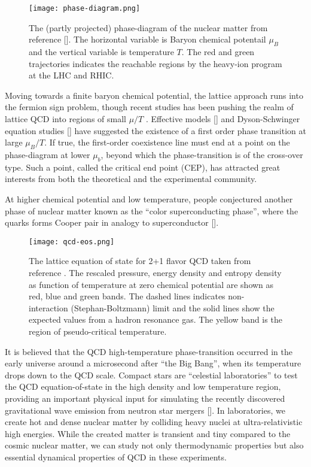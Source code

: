 \begin{figure}
    \centering
    \texttt{[image: phase-diagram.png]}
    \caption{The (partly projected) phase-diagram of the nuclear matter from reference []. The horizontal variable is Baryon chemical potentail $\mu_B$ and the vertical variable is temperature $T$. The red and green trajectories indicates the reachable regions by the heavy-ion program at the LHC and RHIC.}
    \label{fig:phase-diagram}
\end{figure}

Moving towards a finite baryon chemical potential, the lattice approach runs into the fermion sign problem, though recent studies has been pushing the realm of lattice QCD into regions of small $\mu/T$  \cite{Gunther:2016vcp,Bazavov:2017dus}.
Effective models [] and Dyson-Schwinger equation studies [] have suggested the existence of a first order phase transition at large $\mu_B/T$.
If true, the first-order coexistence line must end at a point on the phase-diagram at lower $\mu_b$, beyond which the phase-transition is of the cross-over type.
Such a point, called the critical end point (CEP), has attracted great interests from both the theoretical and the experimental community.

At higher chemical potential and low temperature, people conjectured another phase of nuclear matter known as the ``color superconducting phase'', where the quarks forms Cooper pair in analogy to superconductor [].

\begin{figure}
    \centering
    \texttt{[image: qcd-eos.png]}
    \caption{The lattice equation of state for 2+1 flavor QCD taken from reference \cite{Bazavov:2014pvz}. The rescaled pressure, energy density and entropy density as function of temperature at zero chemical potential are shown as red, blue and green bands. The dashed lines indicates non-interaction (Stephan-Boltzmann) limit and the solid lines show the expected values from a hadron resonance gas. The yellow band is the region of pseudo-critical temperature.}
    \label{fig:qcd_eos}
\end{figure}

It is believed that the QCD high-temperature phase-transition occurred in the early universe around a microsecond after ``the Big Bang'', when its temperature drops down to the QCD scale.
Compact stars are ``celestial laboratories'' to test the QCD equation-of-state in the high density and low temperature region, providing an important physical input for simulating the recently discovered gravitational wave emission from neutron star mergers [].
In laboratories, we create hot and dense nuclear matter by colliding heavy nuclei at ultra-relativistic high energies.
While the created matter is transient and tiny compared to the cosmic nuclear matter, we can study not only thermodynamic properties but also essential dynamical properties of QCD in these experiments.


